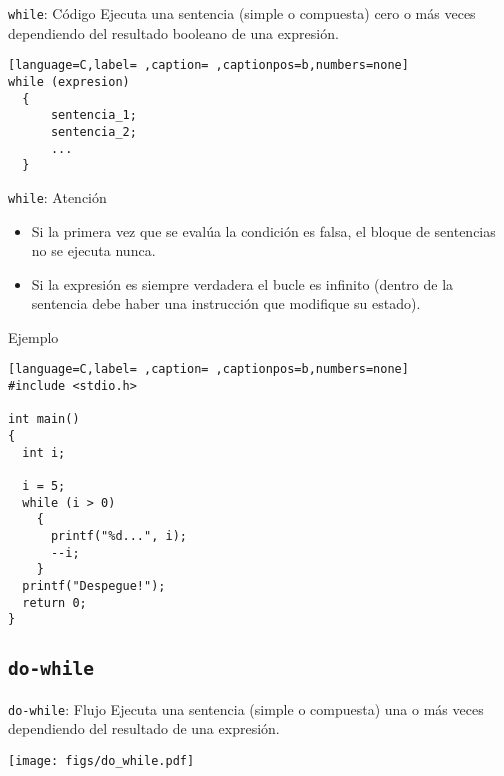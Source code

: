 \documentclass[usenames,svgnames,dvipsnames, aspectratio=169]{beamer}
\begin{document}
\begin{frame}[label={sec:org4f23728},fragile]{\texttt{while}: Código}
 Ejecuta una sentencia (simple o compuesta) \alert{cero o más veces} dependiendo del resultado booleano de una expresión.
\begin{lstlisting}[language=C,label= ,caption= ,captionpos=b,numbers=none]
while (expresion)
  {
      sentencia_1;
      sentencia_2;
      ...
  }

\end{lstlisting}
\end{frame}

\begin{frame}[label={sec:org0df5926},fragile]{\texttt{while}: Atención}
 \begin{block}{}
\begin{itemize}
\item Si la primera vez que se evalúa la condición es falsa, el bloque de sentencias \alert{no se ejecuta nunca}.

\item Si la expresión es siempre verdadera \alert{el bucle es infinito} (dentro de la sentencia debe haber una instrucción que modifique su estado).
\end{itemize}
\end{block}
\end{frame}

\begin{frame}[label={sec:orgfd92a92},fragile]{Ejemplo}
 \begin{lstlisting}[language=C,label= ,caption= ,captionpos=b,numbers=none]
#include <stdio.h>

int main()
{
  int i;

  i = 5;
  while (i > 0)
    {
      printf("%d...", i);
      --i;
    }
  printf("Despegue!");
  return 0;
}
\end{lstlisting}
\end{frame}

\subsection{\texttt{do-while}}
\label{sec:org068b813}

\begin{frame}[label={sec:orgfaa87a7},fragile]{\texttt{do-while}: Flujo}
 Ejecuta una sentencia (simple o compuesta) \alert{una o más veces} dependiendo del resultado de una expresión.

\begin{center}
\texttt{[image: figs/do\_while.pdf]}
\end{center}
\end{frame}
\end{document}
